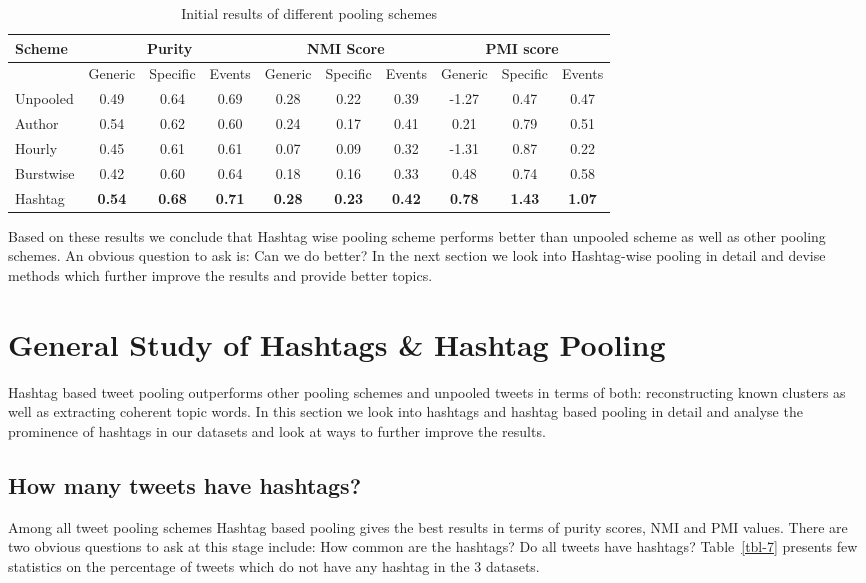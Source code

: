 \documentclass[10pt,a5paper,twoside]{article}
\begin{document}
\begin{table}[!h]
\centering
\resizebox{14cm}{!} 
{
	\begin{tabular}{|l|ccc|ccc|ccc|}
	\hline
	Scheme  & \multicolumn {3}{c|}{Purity} & \multicolumn {3}{c|}{NMI Score} & \multicolumn {3}{c|}{PMI score}\\
	\hline
	 & Generic & Specific & Events &  Generic & Specific & Events &  Generic & Specific & Events\\
	\hline
	Unpooled & 0.49 & 0.64 & 0.69 & 0.28 & 0.22 & 0.39 & -1.27 & 0.47 & 0.47 \\
	\hline
	Author & 0.54 & 0.62 & 0.60 & 0.24 & 0.17 & 0.41 & 0.21 & 0.79 & 0.51 \\
	\hline
	Hourly & 0.45 & 0.61 & 0.61 & 0.07 & 0.09 & 0.32 & -1.31 & 0.87 & 0.22 \\
	\hline
	Burstwise & 0.42 & 0.60 & 0.64 & 0.18 & 0.16 & 0.33 & 0.48 & 0.74 & 0.58 \\
	\hline
	Hashtag & \textbf{0.54} & \textbf{0.68} & \textbf{0.71} & \textbf{0.28} & \textbf{0.23} & \textbf{0.42} & \textbf{0.78} & \textbf{1.43} & \textbf{1.07} \\
	\hline
	\end{tabular}
}
\caption{Initial results of different pooling schemes}\label{tbl-456}
\end{table}



Based on these results we conclude that Hashtag wise pooling scheme performs better than unpooled scheme as well as other pooling schemes. An obvious question to ask is: Can we do better? In the next section we look into Hashtag-wise pooling in detail and devise methods which further improve the results and provide better topics.

\section{General Study of Hashtags \& Hashtag Pooling}

Hashtag based tweet pooling outperforms other pooling schemes and unpooled tweets in terms of both: reconstructing known clusters as well as extracting coherent topic words. In this section we look into hashtags and hashtag based pooling in detail and analyse the prominence of hashtags in our datasets and look at ways to further improve the results.

\subsection{How many tweets have hashtags?}
Among all tweet pooling schemes Hashtag based pooling gives the best results in terms of purity scores, NMI and PMI values. There are two obvious questions to ask at this stage include: How common are the hashtags? Do all tweets have hashtags? Table~\ref{tbl-7} presents few statistics on the percentage of tweets which do not have any hashtag in the 3 datasets.
\end{document}

